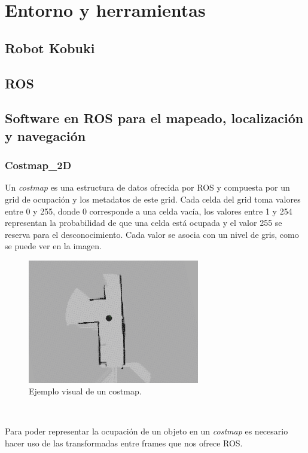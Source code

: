 \chapter{Entorno y herramientas}
\label{cap:entorno}

\section{Robot Kobuki}
\label{cap:robot}
\section{ROS}
\label{cap:ros}
\section{Software en ROS para el mapeado, localización y navegación}
\label{cap:softwarederos}

\subsection{Costmap\_2D}
\label{sec:costmap2d}
Un \textit{costmap} es una estructura de datos ofrecida por ROS y compuesta por un grid de ocupación y los metadatos de este grid. Cada celda del grid toma valores entre 0 y 255, donde 0 corresponde a una celda vacía, los valores entre 1 y 254 representan la probabilidad de que una celda está ocupada y el valor 255 se reserva para el desconocimiento. Cada valor se asocia con un nivel de gris, como se puede ver en la imagen.
\begin{figure} [hbtp]
  \begin{center}
    \includegraphics[width=7.5cm]{img/cap4/costmap-ejemplo}
  \end{center}
  \caption{Ejemplo visual de un costmap.}
  \label{fig:costmap-ejemplo}
\end{figure}\

Para poder representar la ocupación de un objeto en un \textit{costmap} es necesario hacer uso de las transformadas entre frames que nos ofrece ROS.

